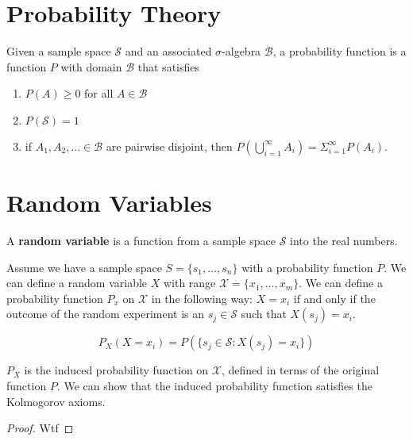 \documentclass[/Users/ssaad/Documents/statinf/main.tex]{subfiles}
\begin{document}
    \section{Probability Theory}

    \begin{theorem}
        Given a sample space $\mathcal{S}$ and an associated $\sigma$-algebra $\mathcal{B}$, a probability function is a function $P$ with domain $\mathcal{B}$ that satisfies
        \begin{enumerate}
            \item $P(A) \geq 0$ for all $A \in \mathcal{B}$
            \item $P(\mathcal{S})=1$
            \item if $A_{1},A_{2},\dots \in \mathcal{B}$ are pairwise disjoint, then $P(\bigcup_{i=1}^{\infty}A_{i})=\Sigma_{i=1}^{\infty}P(A_{i})$.
        \end{enumerate}
    \end{theorem}
    
    \section{Random Variables}

    \begin{definition}
        A \textbf{random variable} is a function from a sample space $\mathcal{S}$ into the real numbers.
    \end{definition}

    Assume we have a sample space $S=\{s_{1},\dots,s_{n}\}$ with a probability function $P$. We can define a random variable $X$ with range $\mathcal{X}=\{x_{1},\dots,x_{m}\}$. 
    We can define a probability function $P_{x}$ on $\mathcal{X}$ in the following way: $X=x_{i}$ if and only if the outcome of the random experiment is an
    $s_{j} \in \mathcal{S}$ such that $X(s_{j})=x_{i}$. 

    \[P_{X}(X=x_{i})=P(\{s_{j} \in \mathcal{S}: X(s_{j})=x_{i}\})\]

    $P_{X}$ is the induced probability function on $\mathcal{X}$, defined in terms of the original function $P$. We can show that the induced probability function 
    satisfies the Kolmogorov axioms.

    \begin{proof}
        Wtf
    \end{proof}
\end{document}
